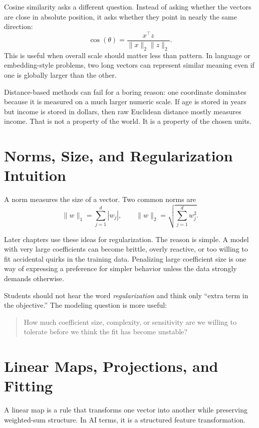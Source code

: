 Cosine similarity asks a different question. Instead of asking whether the vectors are close in absolute position, it asks whether they point in nearly the same direction:
\[
\cos(\theta) = \frac{x^\top z}{\|x\|_2 \|z\|_2}.
\]
This is useful when overall scale should matter less than pattern. In language or embedding-style problems, two long vectors can represent similar meaning even if one is globally larger than the other.

\begin{failurebox}
Distance-based methods can fail for a boring reason: one coordinate dominates because it is measured on a much larger numeric scale. If age is stored in years but income is stored in dollars, then raw Euclidean distance mostly measures income. That is not a property of the world. It is a property of the chosen units.
\end{failurebox}

\section*{Norms, Size, and Regularization Intuition}

A norm measures the size of a vector. Two common norms are
\[
\|w\|_1 = \sum_{j=1}^{d} |w_j|,
\qquad
\|w\|_2 = \sqrt{\sum_{j=1}^{d} w_j^2}.
\]

Later chapters use these ideas for regularization. The reason is simple. A model with very large coefficients can become brittle, overly reactive, or too willing to fit accidental quirks in the training data. Penalizing large coefficient size is one way of expressing a preference for simpler behavior unless the data strongly demands otherwise.

Students should not hear the word \emph{regularization} and think only ``extra term in the objective.'' The modeling question is more useful:

\begin{quote}
How much coefficient size, complexity, or sensitivity are we willing to tolerate before we think the fit has become unstable?
\end{quote}

\section*{Linear Maps, Projections, and Fitting}

A linear map is a rule that transforms one vector into another while preserving weighted-sum structure. In AI terms, it is a structured feature transformation.

